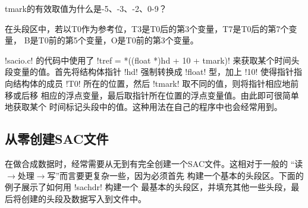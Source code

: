 \begin{note}
tmark的有效取值为什么是-5、-3、-2、0-9？

在头段区中，若以T0作为参考位，T3是T0后的第3个变量，T7是T0后的第7个变量，
B是T0前的第5个变量，O是T0前的第3个变量。

!sacio.c! 的代码中使用了 !tref = *((float *)hd + 10 + tmark)!
来获取某个时间头段变量的值。首先将结构体指针 !hd! 强制转换成
!float! 型，加上 !10! 使得指针指向结构体的成员 !T0!
所在的位置，然后 !tmark! 取不同的值，则将指针相应地前移或后移
相应的浮点变量，最后取指针所在位置的浮点变量值。由此即可很简单地获取某个
时间标记头段中的值。这种用法在自己的程序中也会经常用到。
\end{note}

\subsection{从零创建SAC文件}
在做合成数据时，经常需要从无到有完全创建一个SAC文件。这相对于一般的
``读$\rightarrow$处理$\rightarrow$写''而言要更复杂一些，因为必须首先
构建一个基本的头段区。下面的例子展示了如何用 !sachdr! 构建一个
最基本的头段区，并填充其他一些头段，最后将创建的头段及数据写入到文件中。
\inputminted{C}{./sacio/write_sac.c}
